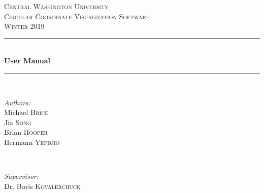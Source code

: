 \documentclass[12pt]{article}
\begin{document}
	
	\begin{titlepage}
		
		\newcommand{\HRule}{\rule{\linewidth}{0.5mm}} %
		
		\center %
		
		
		\textsc{\LARGE Central Washington University}\\[1.5cm] %
		\textsc{\Large Circular Coordinate Visualization Software}\\[0.5cm] %
		\textsc{\large Winter 2019}\\[0.5cm] %
		
		
		\HRule \\[0.4cm]
		{ \huge \bfseries User Manual}\\[0.4cm] %
		\HRule \\[1 cm]
		
		
		\begin{minipage}{0.4\textwidth}
			\begin{flushleft} \large
				\emph{Authors:}\\
				Michael \textsc{Brice}\\ %
				Jia \textsc{Song} \\%
				Brian \textsc{Hooper}\\ %
				Hermann \textsc{Yepdjio}\\ %
			\end{flushleft}
		\end{minipage}
		~
		\begin{minipage}{0.4\textwidth}
			\begin{flushright} \large
				\emph{Supervisor:} \\
				Dr. Boris \textsc{Kovalerchuck} %
			\end{flushright}
		\end{minipage}\\[1cm]
		

\end{titlepage}
\end{document}
